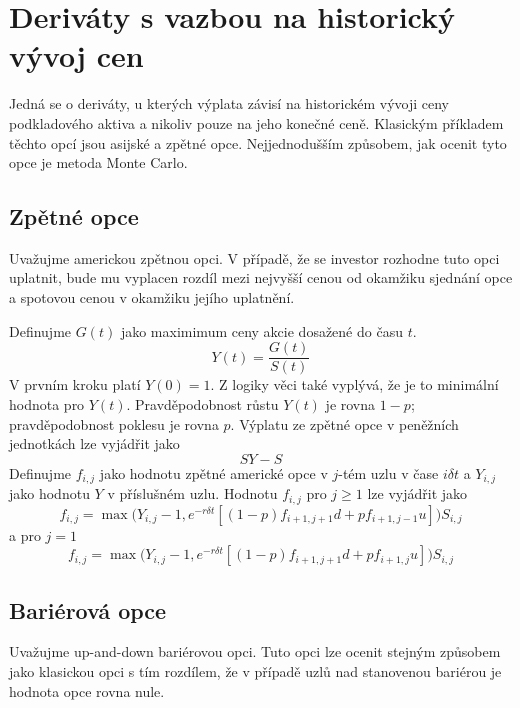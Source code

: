 \documentclass[a4paper]{book}
\begin{document}
\section{Deriváty s vazbou na historický vývoj cen}

Jedná se o deriváty, u kterých výplata závisí na historickém vývoji ceny podkladového aktiva a nikoliv pouze na jeho konečné ceně. Klasickým příkladem těchto opcí jsou asijské a zpětné opce. Nejjednodušším způsobem, jak ocenit tyto opce je metoda Monte Carlo.

\subsection{Zpětné opce}

Uvažujme americkou zpětnou opci. V případě, že se investor rozhodne tuto opci uplatnit, bude mu vyplacen rozdíl mezi nejvyšší cenou od okamžiku sjednání opce a spotovou cenou v okamžiku jejího uplatnění.

Definujme $G(t)$ jako maximimum ceny akcie dosažené do času $t$.
\begin{equation*}
Y(t)=\frac{G(t)}{S(t)}
\end{equation*}
V prvním kroku platí $Y(0)=1$. Z logiky věci také vyplývá, že je to minimální hodnota pro $Y(t)$. Pravděpodobnost růstu $Y(t)$ je rovna $1-p$; pravděpodobnost poklesu je rovna $p$. Výplatu ze zpětné opce v peněžních jednotkách lze vyjádřit jako
\begin{equation*}
SY - S
\end{equation*}
Definujme $f_{i,j}$ jako hodnotu zpětné americké opce v $j$-tém uzlu v čase $i \delta t$ a $Y_{i,j}$ jako hodnotu $Y$ v příslušném uzlu. Hodnotu $f_{i,j}$ pro $j \ge 1$ lze vyjádřit jako
\begin{equation*}
f_{i,j} = \max \Big( Y_{i,j}-1, e^{-r \delta t}[(1-p)f_{i+1,j+1}d+pf_{i+1, j-1}u]\Big)S_{i,j}
\end{equation*}
a pro $j = 1$
\begin{equation*}
f_{i,j} = \max \Big( Y_{i,j} - 1, e^{-r \delta t}[(1-p)f_{i+1,j+1}d + pf_{i+1, j}u] \Big)S_{i,j}
\end{equation*}

\subsection{Bariérová opce}
Uvažujme up-and-down bariérovou opci. Tuto opci lze ocenit stejným způsobem jako klasickou opci s tím rozdílem, že v případě uzlů nad stanovenou bariérou je hodnota opce rovna nule.
\end{document}
